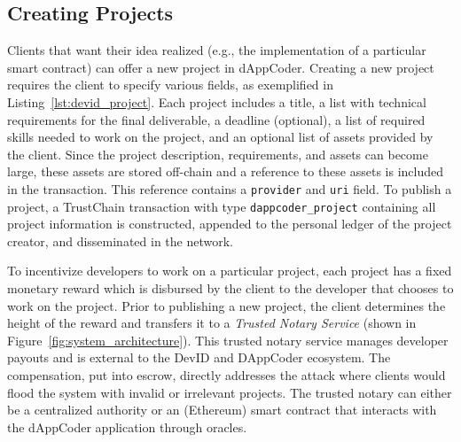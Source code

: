 \subsection{Creating Projects}
Clients that want their idea realized (e.g., the implementation of a particular smart contract) can offer a new project in dAppCoder.
Creating a new project requires the client to specify various fields, as exemplified in Listing~\ref{lst:devid_project}.
Each project includes a title, a list with technical requirements for the final deliverable, a deadline (optional), a list of required skills needed to work on the project, and an optional list of assets provided by the client.
Since the project description, requirements, and assets can become large, these assets are stored off-chain and a reference to these assets is included in the transaction.
This reference contains a \texttt{provider} and \texttt{uri} field.
To publish a project, a TrustChain transaction with type \texttt{dappcoder\_project} containing all project information is constructed, appended to the personal ledger of the project creator, and disseminated in the network.

To incentivize developers to work on a particular project, each project has a fixed monetary reward which is disbursed by the client to the developer that chooses to work on the project.
Prior to publishing a new project, the client determines the height of the reward and transfers it to a \textit{Trusted Notary Service} (shown in Figure~\ref{fig:system_architecture}).
This trusted notary service manages developer payouts and is external to the DevID and DAppCoder ecosystem.
The compensation, put into escrow, directly addresses the attack where clients would flood the system with invalid or irrelevant projects.
The trusted notary can either be a centralized authority or an (Ethereum) smart contract that interacts with the dAppCoder application through oracles.

